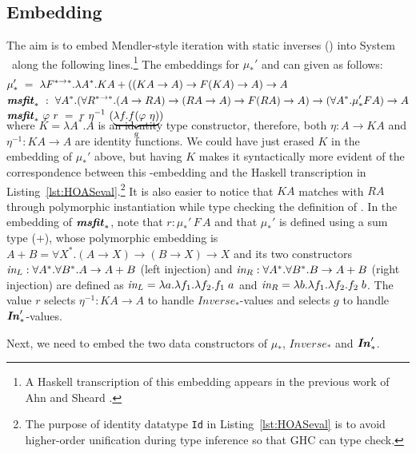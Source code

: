\subsection{Embedding \msfit{*}}\label{sec:theory:embed}
The aim is to embed Mendler-style iteration with static inverses (\msfit{*})
into System \Fw\ along the following lines.\footnote{
	A Haskell transcription of this embedding appears
	in the previous work of Ahn and Sheard \cite{AhnShe11}.}
The embeddings for $\mu_{*}'$ and \msfit{*} can given as follows:\vspace*{-1ex}
\begin{align*}
&\mu_{*}' ~=~ \lambda F^{* \to *}.\lambda A^{*}.
		K A + ((K A \to A) \to F(K A) \to A) \to A
	\\
&\textbf{\textit{msfit}}_{*} ~:~ \forall A^{*}.
	(\forall R^{*\to*}.(A \to R A) \to (R A \to A) \to F(R A) \to A) \to
	(\forall A^{*}.\mu_{*}' F A) \to A \\[-.5ex]
&\textbf{\textit{msfit}}_{*}~\varphi~r ~=~ r~\eta^{-1}~(\underbrace{\lambda f.f(\varphi~\eta)}_g)
	\\[-6ex]
\end{align*}
where $K = \lambda A^{*}.A$ is an identity type constructor, therefore,
both $\eta: A \to KA$ and $\eta^{-1}: KA \to A$ are identity functions.
We could have just erased $K$ in the embedding of $\mu_{*}'$ above,
but having $K$ makes it syntactically more evident of the correspondence
between this \Fw-embedding and the Haskell transcription
in Listing~\ref{lst:HOASeval}.\footnote{
	The purpose of identity datatype \lstinline{Id}
	in Listing~\ref{lst:HOASeval} is to avoid higher-order unification
	during type inference so that GHC can type check.}
It is also easier to notice that $KA$ matches with $RA$ through
polymorphic instantiation while type checking the definition of \msfit{*}.
In the embedding of $\textbf{\textit{msfit}}_{*}$, note that $r : \mu_{*}'\,F\,A$ and that
$\mu_{*}'$ is defined using a sum type ($+$), whose polymorphic embedding is
$A + B = \forall X^{*}.(A \to X) \to (B \to X) \to X$ and its two constructors
$\textit{in}_{L} : \forall A^{*}.\forall B^{*}.A \to A + B$ (left injection) and
$\textit{in}_{R} : \forall A^{*}.\forall B^{*}.B \to A + B$ (right injection) are
defined as $\textit{in}_{L} = \lambda a.\lambda f_1.\lambda f_2.f_1\;a$ and
$\textit{in}_{R} = \lambda b.\lambda f_1.\lambda f_2.f_2\;b$. The value $r$ selects
$\eta^{-1} : KA \to A$ to handle $\textit{Inverse}_{*}$-values and selects
$g$ to handle $\textbf{\textit{In}}_{*}'$-values.


Next, we need to embed the two data constructors of $\mu_{*}$,
$\textit{Inverse}_{*}$ and $\textbf{\textit{In}}_{*}'$.

